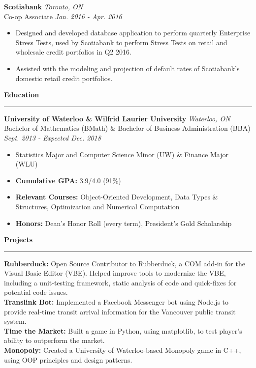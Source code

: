 \documentclass{letter}
\begin{document}
\begin{flushleft}
		{\large\textbf{Scotiabank}}  \hfill \textit{Toronto, ON} \\
		\vspace{1pt}
		Co-op Associate \hfill \textit{Jan. 2016 - Apr. 2016}
		\vspace{-9pt}
		\begin{itemize}
			\item Designed and developed database application to perform quarterly Enterprise Stress Tests, used by Scotiabank to perform Stress Tests on retail and wholesale credit portfolios in Q2 2016.\vspace{-3pt}
			\item Assisted with the modeling and projection of default rates of Scotiabank's domestic retail credit portfolios. 
		\end{itemize}
	\end{flushleft}

	\begin{flushleft}
		{\Large \textbf{Education}}
		\rule[5pt]{\textwidth}{0.4pt}
		{\large \textbf{University of Waterloo \& Wilfrid Laurier University}} \hfill \textit{Waterloo, ON}\\
		Bachelor of Mathematics (BMath) \& Bachelor of Business Administration (BBA) \hfill \textit{Sept. 2013 - Expected Dec. 2018}
		\vspace{-7.5pt}
		\begin{itemize}
			\item Statistics Major and Computer Science Minor (UW) \& Finance Major (WLU) \vspace{-3pt}
			\item \textbf{Cumulative GPA:} 3.9/4.0 (91\%) \vspace{-3pt}
			\item \textbf{Relevant Courses:} Object-Oriented Development, Data Types \& Structures, Optimization and Numerical Computation \vspace{-3pt}
			\item \textbf{Honors:} Dean's Honor Roll (every term), President's Gold Scholarship
		\end{itemize}
	\end{flushleft}

	\begin{flushleft}
		{\Large \textbf{Projects}}
		\rule[5pt]{\textwidth}{0.4pt}
		\textbf{Rubberduck:} Open Source Contributor to Rubberduck, a COM add-in for the Visual Basic Editor (VBE). Helped improve tools to modernize the VBE, including a unit-testing framework, static analysis of code and quick-fixes for potential code issues.\\
		\textbf{Translink Bot:} Implemented a Facebook Messenger bot using Node.js to provide real-time transit arrival information for the Vancouver public transit system.\\
		\textbf{Time the Market:} Built a game in Python, using matplotlib, to test player's ability to outperform the market.\\
		\textbf{Monopoly:} Created a University of Waterloo-based Monopoly game in C++, using OOP principles and design patterns.
	\end{flushleft}
	
\end{document}
